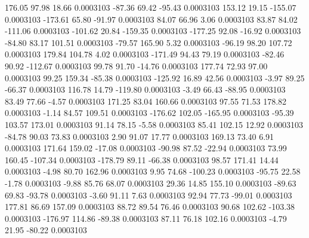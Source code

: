       176.05       97.98       18.66     0.0003103
      -87.36       69.42      -95.43     0.0003103
      153.12       19.15     -155.07     0.0003103
     -173.61       65.80      -91.97     0.0003103
       84.07       66.96        3.06     0.0003103
       83.87       84.02     -111.06     0.0003103
     -101.62       20.84     -159.35     0.0003103
     -177.25       92.08      -16.92     0.0003103
      -84.80       83.17      101.51     0.0003103
      -79.57      165.90        5.32     0.0003103
      -96.19       98.20      107.72     0.0003103
      179.84      104.78        4.02     0.0003103
     -171.49       94.43       79.19     0.0003103
      -82.46       90.92     -112.67     0.0003103
       99.78       91.70      -14.76     0.0003103
      177.74       72.93       97.00     0.0003103
       99.25      159.34      -85.38     0.0003103
     -125.92       16.89       42.56     0.0003103
       -3.97       89.25      -66.37     0.0003103
      116.78       14.79     -119.80     0.0003103
       -3.49       66.43      -88.95     0.0003103
       83.49       77.66       -4.57     0.0003103
      171.25       83.04      160.66     0.0003103
       97.55       71.53      178.82     0.0003103
       -1.14       84.57      109.51     0.0003103
     -176.62      102.05     -165.95     0.0003103
      -95.39      103.57      173.01     0.0003103
       91.14       78.15       -5.58     0.0003103
       85.41      102.15       12.92     0.0003103
      -84.78       90.03       73.83     0.0003103
        2.90       91.07       17.77     0.0003103
      169.13       73.40        6.91     0.0003103
      171.64      159.02      -17.08     0.0003103
      -90.98       87.52      -22.94     0.0003103
       73.99      160.45     -107.34     0.0003103
     -178.79       89.11      -66.38     0.0003103
       98.57      171.41       14.44     0.0003103
       -4.98       80.70      162.96     0.0003103
        9.95       74.68     -100.23     0.0003103
      -95.75       22.58       -1.78     0.0003103
       -9.88       85.76       68.07     0.0003103
       29.36       14.85      155.10     0.0003103
      -89.63       69.83      -93.78     0.0003103
       -3.60       91.11        7.63     0.0003103
       92.94       77.73      -99.01     0.0003103
      177.81       86.69      157.09     0.0003103
       88.72       89.54       76.46     0.0003103
       90.68      102.62     -103.38     0.0003103
     -176.97      114.86      -89.38     0.0003103
       87.11       76.18      102.16     0.0003103
       -4.79       21.95      -80.22     0.0003103
